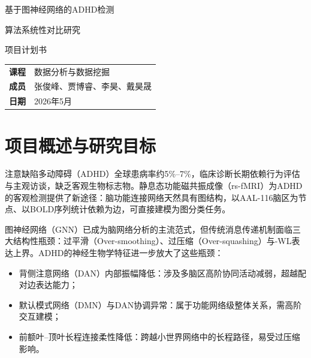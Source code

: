 \documentclass[12pt,a4paper,heading=true,fontset=windows]{ctexart}
\newcommand{\kw}[1]{{\heiti #1}}
\begin{document}
\begin{titlepage}
    \centering
    \vspace*{3cm}

    {\heiti\fontsize{28pt}{36pt}\selectfont\color{NavyBlue}
        基于图神经网络的ADHD检测\par}
    \vspace{0.5cm}
    {\heiti\fontsize{22pt}{30pt}\selectfont\color{NavyBlue}
        算法系统性对比研究\par}

    \vspace{1.5cm}
    {\LARGE\heiti 项目计划书\par}

    \vspace{4cm}

    {\large
        \begin{tabular}{rl}
            \textbf{课程} & 数据分析与数据挖掘      \\
            \textbf{成员} & 张俊峰、贾博睿、李昊、戴昊晟 \\
            \textbf{日期} & 2026年5月        \\
        \end{tabular}\par}

\end{titlepage}

\section{项目概述与研究目标}

注意缺陷多动障碍（ADHD）全球患病率约5\%--7\%，临床诊断长期依赖行为评估与主观访谈，缺乏客观生物标志物。静息态功能磁共振成像（rs-fMRI）为ADHD的客观检测提供了新途径：脑功能连接网络天然具有图结构，以AAL-116脑区为节点、以BOLD序列统计依赖为边，可直接建模为图分类任务。

图神经网络（GNN）已成为脑网络分析的主流范式，但传统消息传递机制面临三大结构性瓶颈：\kw{过平滑（Over-smoothing）}、\kw{过压缩（Over-squashing）}与\kw{1-WL表达上界}。ADHD的神经生物学特征进一步放大了这些瓶颈：
\begin{itemize}
    \item \kw{背侧注意网络（DAN）内部振幅降低}：涉及多脑区高阶协同活动减弱，超越配对边表达能力；
    \item \kw{默认模式网络（DMN）与DAN协调异常}：属于功能网络级整体关系，需高阶交互建模；
    \item \kw{前额叶--顶叶长程连接柔性降低}：跨越小世界网络中的长程路径，易受过压缩影响。
\end{itemize}
\end{document}
